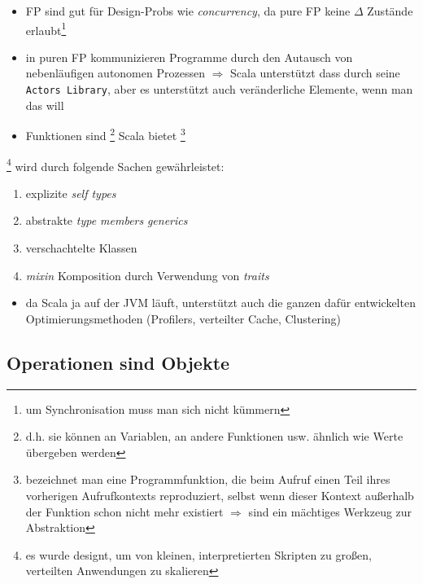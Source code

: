 

\begin{itemize}
  \item FP sind gut für Design-Probs wie \textit{concurrency}, da pure FP
  keine $\Delta$ Zustände erlaubt\footnote{um Synchronisation muss man
  sich nicht kümmern}
  \item in puren FP kommunizieren Programme durch den Autausch von
  nebenläufigen autonomen Prozessen $\Rightarrow$ Scala unterstützt dass
  durch seine \texttt{Actors Library}, aber es unterstützt auch
  veränderliche Elemente, wenn man das will
  \item Funktionen sind \footnote{d.h. sie können 
  an Variablen, an andere Funktionen usw. ähnlich wie Werte übergeben werden}
  \und Scala bietet \footnote{bezeichnet man 
  eine Programmfunktion, die beim Aufruf einen Teil ihres vorherigen
  Aufrufkontexts reproduziert, selbst wenn dieser Kontext außerhalb der 
  Funktion schon nicht mehr existiert $\Rightarrow$ sind ein mächtiges 
  Werkzeug zur Abstraktion} 
\end{itemize}


\footnote{es wurde designt, um von kleinen, interpretierten
Skripten zu großen, verteilten Anwendungen zu skalieren} wird durch folgende
Sachen gewährleistet:


\begin{enumerate}
  \item explizite \textit{self types}
  \item abstrakte \textit{type members} \und \textit{generics}
  \item verschachtelte Klassen
  \item \textit{mixin} Komposition durch Verwendung von \textit{traits}
\end{enumerate}




\begin{itemize}
  \item da Scala ja auf der JVM läuft, unterstützt auch die ganzen dafür
  entwickelten Optimierungsmethoden (Profilers, verteilter Cache, Clustering)
\end{itemize}


\subsection{Operationen sind Objekte}


